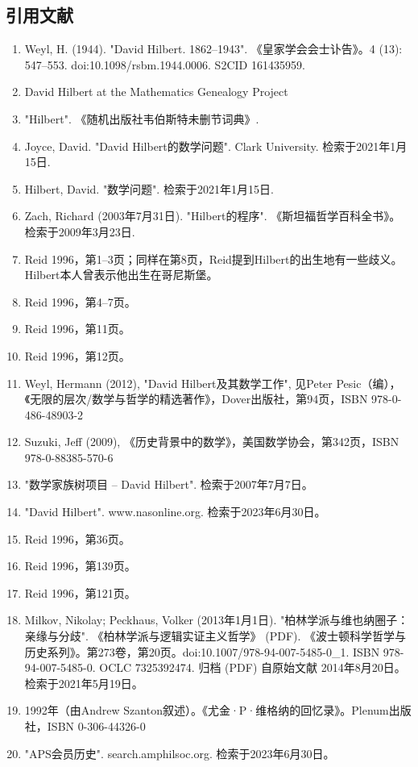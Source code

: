 \subsection{引用文献}
\begin{enumerate}
\item Weyl, H. (1944). "David Hilbert. 1862–1943". 《皇家学会会士讣告》。4 (13): 547–553. doi:10.1098/rsbm.1944.0006. S2CID 161435959.
\item David Hilbert at the Mathematics Genealogy Project
\item "Hilbert". 《随机出版社韦伯斯特未删节词典》.
\item Joyce, David. "David Hilbert的数学问题". Clark University. 检索于2021年1月15日.
\item Hilbert, David. "数学问题". 检索于2021年1月15日.
\item Zach, Richard (2003年7月31日). "Hilbert的程序". 《斯坦福哲学百科全书》。检索于2009年3月23日.
\item Reid 1996，第1–3页；同样在第8页，Reid提到Hilbert的出生地有一些歧义。Hilbert本人曾表示他出生在哥尼斯堡。
\item Reid 1996，第4–7页。
\item Reid 1996，第11页。
\item Reid 1996，第12页。
\item Weyl, Hermann (2012), "David Hilbert及其数学工作", 见Peter Pesic（编），《无限的层次/数学与哲学的精选著作》，Dover出版社，第94页，ISBN 978-0-486-48903-2
\item Suzuki, Jeff (2009), 《历史背景中的数学》，美国数学协会，第342页，ISBN 978-0-88385-570-6
\item "数学家族树项目 – David Hilbert". 检索于2007年7月7日。
\item "David Hilbert". www.nasonline.org. 检索于2023年6月30日。
\item Reid 1996，第36页。
\item Reid 1996，第139页。
\item Reid 1996，第121页。
\item Milkov, Nikolay; Peckhaus, Volker (2013年1月1日). "柏林学派与维也纳圈子：亲缘与分歧". 《柏林学派与逻辑实证主义哲学》 (PDF). 《波士顿科学哲学与历史系列》。第273卷，第20页。doi:10.1007/978-94-007-5485-0_1. ISBN 978-94-007-5485-0. OCLC 7325392474. 归档 (PDF) 自原始文献 2014年8月20日。检索于2021年5月19日。
\item 1992年（由Andrew Szanton叙述）。《尤金·P·维格纳的回忆录》。Plenum出版社，ISBN 0-306-44326-0
\item "APS会员历史". search.amphilsoc.org. 检索于2023年6月30日。

\end{enumerate}
